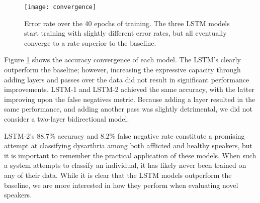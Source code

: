 \begin{figure}[h]
\centering
\texttt{[image: convergence]}
\caption{Error rate over the 40 epochs of training. The three LSTM models start training with slightly different error rates, but all  eventually converge to a rate superior to the baseline. }
\label{fig-convergence}
\end{figure}

Figure \ref{fig-convergence} shows the accuracy convergence of each model. The LSTM's clearly outperform the baseline; however, increasing the expressive capacity through adding layers and passes over the data did not result in significant performance improvements. LSTM-1 and LSTM-2 achieved the same accuracy, with the latter improving upon the false negatives metric. Because adding a layer resulted in the same performance, and adding another pass was slightly detrimental, we did not consider a two-layer bidirectional model. 

LSTM-2's $88.7$\% accuracy and 8.2\% false negative rate constitute a promising attempt at classifying dysarthria among both afflicted and healthy speakers, but it is important to remember the practical application of these models. When such a system attempts to classify an individual, it has likely never been trained on any of their data. While it is clear that the LSTM models outperform the baseline, we are more interested in how they perform when evaluating novel speakers. 